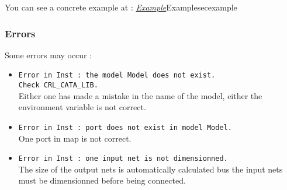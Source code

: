 \begin{htmlonly}
You can see a concrete example at : \hyperref[ref]{\emph{Example}}{}{Example}{secexample}
\end{htmlonly}

\subsubsection{Errors}
    
Some errors may occur :
\begin{itemize}
    \item \verb-Error in Inst : the model Model does not exist.-\\\verb-Check CRL_CATA_LIB.-\\Either one has made a mistake in the name of the model, either the environment variable is not correct.
    \item \verb-Error in Inst : port does not exist in model Model.-\\One port in map is not correct.
    \item \verb-Error in Inst : one input net is not dimensionned.-\\The size of the output nets is automatically calculated bus the input nets must be dimensionned before being connected.
\end{itemize}

\begin{htmlonly}

\end{htmlonly}
